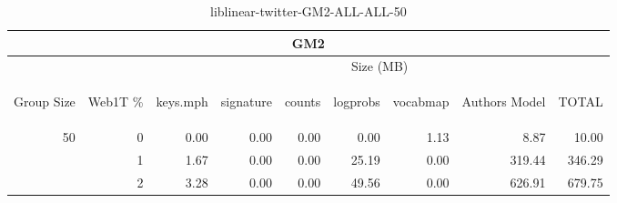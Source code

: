 \begin{center}
\begin{table}[htbp] 
 \begin{center}
\begin{tabular}{ | r | r | r | r | r | r | r | r | r |}
\hline
\multicolumn{9}{|c|}{GM2}\\
\hline
 & & \multicolumn{7}{|c|}{Size (MB)}\\ \cline{3-9}
\begin{sideways}Group Size\end{sideways} & \begin{sideways}Web1T \% \end{sideways} & \begin{sideways}keys.mph\end{sideways} & \begin{sideways}signature\end{sideways} & \begin{sideways}counts\end{sideways} & \begin{sideways}logprobs\end{sideways} & \begin{sideways}vocabmap\end{sideways} & \begin{sideways}Authors Model \end{sideways} & \begin{sideways}TOTAL\end{sideways}\\
\hline
\multirow{2}{*}{50}
 & 0 & 0.00 & 0.00 & 0.00 & 0.00 & 1.13 & 8.87 & 10.00\\ \cline{2-9}
 & 1 & 1.67 & 0.00 & 0.00 & 25.19 & 0.00 & 319.44 & 346.29\\ \cline{2-9}
 & 2 & 3.28 & 0.00 & 0.00 & 49.56 & 0.00 & 626.91 & 679.75\\ \cline{2-9}
\hline
\end{tabular}
\caption{liblinear-twitter-GM2-ALL-ALL-50}
\label{table:liblinear-twitter-GM2-ALL-ALL-50}
\end{center}
 \end{table}
\end{center}

